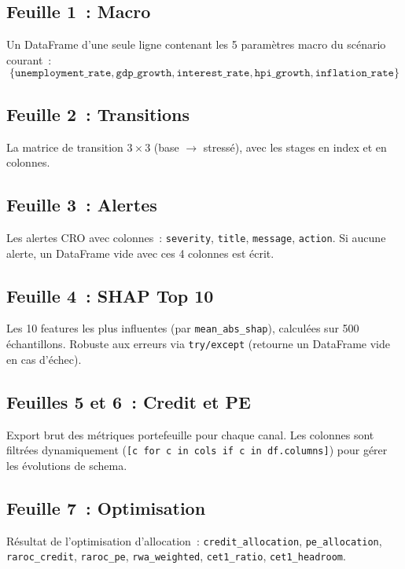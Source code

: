 \documentclass[12pt,a4paper]{article}
\begin{document}
\subsection{Feuille 1~: Macro}

Un DataFrame d'une seule ligne contenant les 5 param\`etres macro du sc\'enario courant~:
\[
\{\texttt{unemployment\_rate}, \texttt{gdp\_growth}, \texttt{interest\_rate}, \texttt{hpi\_growth}, \texttt{inflation\_rate}\}
\]

\subsection{Feuille 2~: Transitions}

La matrice de transition $3 \times 3$ (base $\to$ stress\'e), avec les stages en index et en colonnes.

\subsection{Feuille 3~: Alertes}

Les alertes CRO avec colonnes~: \texttt{severity}, \texttt{title}, \texttt{message}, \texttt{action}. Si aucune alerte, un DataFrame vide avec ces 4 colonnes est \'ecrit.

\subsection{Feuille 4~: SHAP Top 10}

Les 10 features les plus influentes (par \texttt{mean\_abs\_shap}), calcul\'ees sur 500 \'echantillons. Robuste aux erreurs via \texttt{try/except} (retourne un DataFrame vide en cas d'\'echec).

\subsection{Feuilles 5 et 6~: Credit et PE}

Export brut des m\'etriques portefeuille pour chaque canal. Les colonnes sont filtr\'ees dynamiquement (\texttt{[c for c in cols if c in df.columns]}) pour g\'erer les \'evolutions de schema.

\subsection{Feuille 7~: Optimisation}

R\'esultat de l'optimisation d'allocation~: \texttt{credit\_allocation}, \texttt{pe\_allocation}, \texttt{raroc\_credit}, \texttt{raroc\_pe}, \texttt{rwa\_weighted}, \texttt{cet1\_ratio}, \texttt{cet1\_headroom}.
\end{document}
